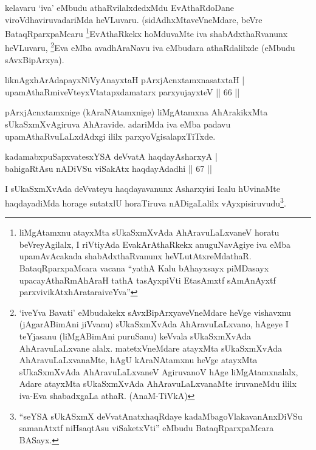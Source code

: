 \begin{artha}
kelavaru `iva' eMbudu athaRvilalxdedxMdu EvAthaRdoDane viroVdhaviruvadariMda heVLuvaru. (sidAdhxMtaveVneMdare, beVre BataqRparxpaMcaru \footnote{liMgAtamxnu atayxMta sUkaSxmXvAda AhAravuLaLxvaneV horatu beVreyAgilalx, I riVtiyAda EvakArAthaRkekx anuguNavAgiye iva eMba upamAvAcakada shabAdxthaRvanunx heVLutAtxreMdathaR. BataqRparxpaMcara vacana \mdash ``yathA Kalu bAhayxsayx piMDasayx upacayAthaRmAhAraH tathA tasAyxpiVti EtasAmxtf sAmAnAyxtf parxvivikAtxhArataraiveYva''}EvAthaRkekx hoMduvaMte iva shabAdxthaRvanunx heVLuvaru, \footnote{`iveYva Bavati' eMbudakekx sAvxBipArxyaveVneMdare heVge vishavxnu (jAgarABimAni jiVvanu) sUkaSxmXvAda AhAravuLaLxvano, hAgeye I teYjasanu (liMgABimAni puruSanu) keVvala sUkaSxmXvAda AhAravuLaLxvane alalx. matetxVneMdare atayxMta sUkaSxmXvAda AhAravuLaLxvanaMte, hAgU kAraNAtamxnu heVge atayxMta sUkaSxmXvAda AhAravuLaLxvaneV AgiruvanoV hAge liMgAtamxnalalx, Adare atayxMta sUkaSxmXvAda AhAravuLaLxvanaMte iruvaneMdu ililx iva-Eva shabadxgaLa athaR. (AnaM-TiVkA)}Eva eMba avadhAraNavu iva eMbudara athaRdalilxde (eMbudu sAvxBipArxya).
\end{artha}


\begin{shl}
liknAgxhArAdapayxNiVyAnayxtaH pArxjAcnxtamxnasatxtaH |\\
upamAthaRmiveVteyxVtatapxdamatarx parxyujayxteV \hfill || 66 || 
\end{shl}

\begin{artha}
pArxjAcnxtamxnige (kAraNAtamxnige) liMgAtamxna AhArakikxMta sUkaSxmXvAgiruva AhAravide. adariMda iva eMba padavu upamAthaRvuLaLxdAdxgi ililx parxyoVgisalapxTiTxde.
\end{artha}


\begin{shl}
kadamabxpuSapxvatesxYSA deVvatA haqdayAsharxyA |\\
bahigaRtAsu nADiVSu viSakAtx haqdayAdadhi \hfill || 67 || 
\end{shl}

\begin{artha}
I sUkaSxmXvAda deVvateyu haqdayavanunx Asharxyisi Icalu hUvinaMte haqdayadiMda horage sutatxlU horaTiruva nADigaLalilx vAyxpisiruvudu\footnote{``seYSA sUkASxmX deVvatA\s natxhaqRdaye kadaMbagoVlakavanAnxDiVSu samanAtxtf niHsaqtAsu viSaketxVti'' eMbudu BataqRparxpaMcara BASayx.}.
\end{artha}

